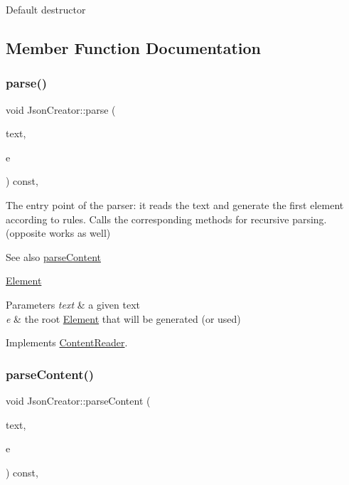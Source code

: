 Default destructor 

\subsection{Member Function Documentation}
\mbox{\label{classJsonCreator_a505ff309c6b144d29478804b0e187c6f}} 
\subsubsection{\texorpdfstring{parse()}{parse()}}
{\footnotesize\ttfamily void Json\+Creator\+::parse (\begin{DoxyParamCaption}\item[{std\+::string \&}]{text,  }\item[{\mbox{\hyperlink{classElement}{Element}} $\ast$$\ast$}]{e }\end{DoxyParamCaption}) const\hspace{0.3cm}{\ttfamily [override]}, {\ttfamily [virtual]}}

The entry point of the parser\+: it reads the text and generate the first element according to rules. Calls the corresponding methods for recursive parsing. (opposite works as well) \begin{DoxySeeAlso}{See also}
\mbox{\hyperlink{classJsonCreator_a0fe34794ee3563c3e0bc35006129fcdc}{parse\+Content}} 

\mbox{\hyperlink{classElement}{Element}}
\end{DoxySeeAlso}

\begin{DoxyParams}{Parameters}
{\em text} & a given text \\
\hline
{\em e} & the root \mbox{\hyperlink{classElement}{Element}} that will be generated (or used) \\
\hline
\end{DoxyParams}


Implements \mbox{\hyperlink{classContentReader_a7fff2e63a2e8fa216665604f69974e1d}{Content\+Reader}}.

\mbox{\label{classJsonCreator_a0fe34794ee3563c3e0bc35006129fcdc}} 
\subsubsection{\texorpdfstring{parse\+Content()}{parseContent()}\hspace{0.1cm}{\footnotesize\ttfamily [1/6]}}
{\footnotesize\ttfamily void Json\+Creator\+::parse\+Content (\begin{DoxyParamCaption}\item[{std\+::string \&}]{text,  }\item[{\mbox{\hyperlink{classElementInt}{Element\+Int}} $\ast$}]{e }\end{DoxyParamCaption}) const\hspace{0.3cm}{\ttfamily [override]}, {\ttfamily [virtual]}}


